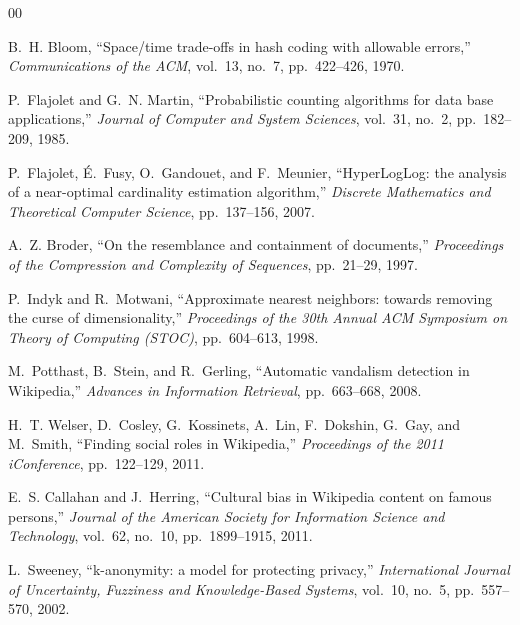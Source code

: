 \documentclass[conference]{IEEEtran}
\begin{document}
\begin{thebibliography}{00}

B.~H. Bloom, ``Space/time trade-offs in hash coding with allowable errors,''
\textit{Communications of the ACM}, vol.~13, no.~7, pp.~422--426, 1970.

P.~Flajolet and G.~N. Martin, ``Probabilistic counting algorithms for data base applications,''
\textit{Journal of Computer and System Sciences}, vol.~31, no.~2, pp.~182--209, 1985.

P.~Flajolet, {\'E}.~Fusy, O.~Gandouet, and F.~Meunier, ``HyperLogLog: the analysis of a near-optimal cardinality estimation algorithm,''
\textit{Discrete Mathematics and Theoretical Computer Science}, pp.~137--156, 2007.

A.~Z. Broder, ``On the resemblance and containment of documents,''
\textit{Proceedings of the Compression and Complexity of Sequences}, pp.~21--29, 1997.

P.~Indyk and R.~Motwani, ``Approximate nearest neighbors: towards removing the curse of dimensionality,''
\textit{Proceedings of the 30th Annual ACM Symposium on Theory of Computing (STOC)}, pp.~604--613, 1998.

M.~Potthast, B.~Stein, and R.~Gerling, ``Automatic vandalism detection in Wikipedia,''
\textit{Advances in Information Retrieval}, pp.~663--668, 2008.

H.~T. Welser, D.~Cosley, G.~Kossinets, A.~Lin, F.~Dokshin, G.~Gay, and M.~Smith, ``Finding social roles in Wikipedia,''
\textit{Proceedings of the 2011 iConference}, pp.~122--129, 2011.

E.~S. Callahan and J.~Herring, ``Cultural bias in Wikipedia content on famous persons,''
\textit{Journal of the American Society for Information Science and Technology}, vol.~62, no.~10, pp.~1899--1915, 2011.

L.~Sweeney, ``k-anonymity: a model for protecting privacy,''
\textit{International Journal of Uncertainty, Fuzziness and Knowledge-Based Systems}, vol.~10, no.~5, pp.~557--570, 2002.

\end{thebibliography}
\end{document}
